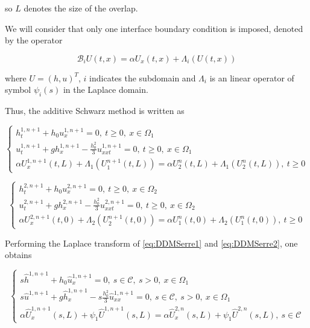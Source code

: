\noindent so $L$ denotes the size of the overlap.

\indent We will consider that only one interface boundary condition is imposed, denoted by the operator 

\begin{equation}
	\mathcal{B}_i U(t,x) = \alpha U_x(t,x) + \Lambda_i(U(t,x)) 
\end{equation}

\indent where $U=(h,u)^T$, $i$ indicates the subdomain and $\Lambda_i$ is an linear operator of symbol $\psi_i(s)$ in the Laplace domain.

\indent Thus, the additive Schwarz method is written as

 \begin{equation}
 \label{eq:DDMSerre1}
 \begin{cases}
 h_t^{1,n+1} + h_0 u_x^{1,n+1} = 0, \ t \geq 0, \ x \in \Omega_1 \\
 u_t^{1,n+1} + gh_x^{1,n+1} - \frac{h_0^2}{3}u_{xxt}^{1,n+1} = 0, \ t \geq 0, \ x \in \Omega_1 \\
 \alpha U_x^{1,n+1}(t,L) + \Lambda_1(U_1^{n+1}(t,L)) =   \alpha U_2^{n}(t,L) + \Lambda_1(U_2^{n}(t,L)), \ t\geq 0
 \end{cases}
 \end{equation}
 
  \begin{equation}
   \label{eq:DDMSerre2}
 \begin{cases}
 h_t^{2,n+1} + h_0 u_x^{2,n+1} = 0, \ t \geq 0, \ x \in \Omega_2 \\
 u_t^{2,n+1} + gh_x^{2,n+1} - \frac{h_0^2}{3}u_{xxt}^{2,n+1} = 0, \ t \geq 0, \ x \in \Omega_2 \\
 \alpha U_x^{2,n+1}(t,0) + \Lambda_2(U_2^{n+1}(t,0)) =   \alpha U_1^{n}(t,0) + \Lambda_2(U_1^{n}(t,0)), \ t\geq 0
 \end{cases}
 \end{equation}
 
 \indent Performing the Laplace transform of \eqref{eq:DDMSerre1} and \eqref{eq:DDMSerre2}, one obtains
 
 \begin{equation}
 \label{eq:DDMSerreLaplace1}
 \begin{cases}
 s\hat{h}^{1,n+1} + h_0\hat{u}_x^{1,n+1} = 0, \ s \in \mathcal{C}, \ s > 0, \ x \in \Omega_1 \\
 s\hat{u}^{1,n+1} + g \hat{h}_x^{1,n+1} - s\frac{h_0^2}{3}\hat{u}^{1,n+1}_{xx} = 0, \ s \in \mathcal{C}, \ s > 0, \ x \in \Omega_1  \\
 \alpha \hat{U}_x^{1,n+1}(s,L) + \psi_1\hat{U}^{1,n+1}(s,L) = \alpha \hat{U}_x^{2,n}(s,L) + \psi_1\hat{U}^{2,n}(s,L), \ s \in \mathcal{C} 
 \end{cases}
 \end{equation}
 
